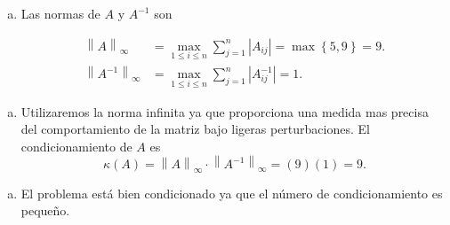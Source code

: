 \begin{frame}
	\begin{solution}
		\begin{enumerate}[b)]
			\item

			      Las normas de $A$ y $A^{-1}$ son

			      \begin{align*}
				      {\left\|A\right\|}_{\infty}      & =
				      \max\limits_{1\leq i\leq n}
				      \sum_{j=1}^{n}\left|A_{ij}\right|=
				      \max\left\{5,9\right\}=9.            \\
				      {\left\|A^{-1}\right\|}_{\infty} & =
				      \max\limits_{1\leq i\leq n}
				      \sum_{j=1}^{n}\left|A^{-1}_{ij}\right|=
				      1.
			      \end{align*}
		\end{enumerate}
	\end{solution}
\end{frame}

\begin{frame}
	\begin{solution}
		\begin{enumerate}[c)]
			\item
			      Utilizaremos la norma infinita ya que proporciona una medida mas precisa del comportamiento de la matriz bajo ligeras perturbaciones.
			      El condicionamiento de $A$ es
			      \begin{equation*}
				      \kappa\left(A\right)=
				      {\left\|A\right\|}_{\infty}\cdot
				      {\left\|A^{-1}\right\|}_{\infty}=\left(9\right)\left(1\right)=9.
			      \end{equation*}

		\end{enumerate}
	\end{solution}
\end{frame}

\begin{frame}
	\begin{solution}
		\begin{enumerate}[d)]
			\item

			      El problema está bien condicionado ya que el número de condicionamiento es pequeño.
		\end{enumerate}
	\end{solution}
\end{frame}